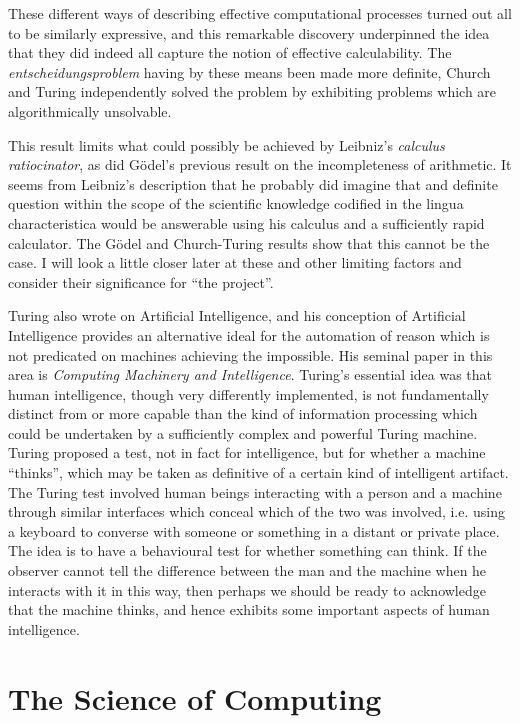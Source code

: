 These different ways of describing effective computational processes turned out all to be similarly expressive, and this remarkable discovery underpinned the idea that they did indeed all capture the notion of effective calculability.
The \emph{entscheidungsproblem} having by these means been made more definite, Church and Turing independently solved the problem by exhibiting problems which are algorithmically unsolvable.

This result limits what could possibly be achieved by Leibniz's \emph{calculus ratiocinator}, as did G\"odel's previous result on the incompleteness of arithmetic.
It seems from Leibniz's description that he probably did imagine that and definite question within the scope of the scientific knowledge codified in the lingua characteristica would be answerable using his calculus and a sufficiently rapid calculator.
The G\"odel and Church-Turing results show that this cannot be the case.
I will look a little closer later at these and other limiting factors and consider their significance for ``the project''.

Turing also wrote on Artificial Intelligence, and his conception of Artificial Intelligence provides an alternative ideal for the automation of reason which is not predicated on machines achieving the impossible.
His seminal paper in this area is \emph{Computing Machinery and Intelligence}\cite{turingCMI}.
Turing's essential idea was that human intelligence, though very differently implemented, is not fundamentally distinct from or more capable than the kind of information processing which could be undertaken by a sufficiently complex and powerful Turing machine.
Turing proposed a test, not in fact for intelligence, but for whether a machine ``thinks'', which may be taken as definitive of a certain kind of intelligent artifact.
The Turing test involved human beings interacting with a person and a machine through similar interfaces which conceal which of the two was involved, i.e. using a keyboard to converse with someone or something in a distant or private place.
The idea is to have a behavioural test for whether something can think.
If the observer cannot tell the difference between the man and the machine when he interacts with it in this way, then perhaps we should be ready to acknowledge that the machine thinks, and hence exhibits some important aspects of human intelligence.

\section{The Science of Computing}

